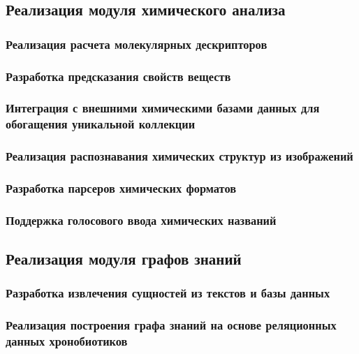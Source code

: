 \documentclass{syksu-coursework}
\begin{document}
\subsection{Реализация модуля химического анализа}

\subsubsection{Реализация расчета молекулярных дескрипторов}

\subsubsection{Разработка предсказания свойств веществ}

\subsubsection{Интеграция с внешними химическими базами данных для обогащения уникальной коллекции}

\subsubsection{Реализация распознавания химических структур из изображений}

\subsubsection{Разработка парсеров химических форматов}

\subsubsection{Поддержка голосового ввода химических названий}

\subsection{Реализация модуля графов знаний}

\subsubsection{Разработка извлечения сущностей из текстов и базы данных}

\subsubsection{Реализация построения графа знаний на основе реляционных данных хронобиотиков}
\end{document}
